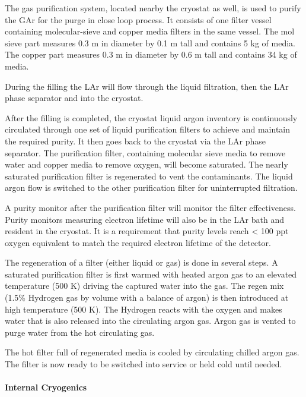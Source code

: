 The gas purification system, located nearby the cryostat as well, is used to purify the GAr for the purge in close loop process. It consists of one filter vessel containing molecular-sieve and copper media filters in the same vessel. The mol sieve part measures 0.3 m in diameter by 0.1 m tall and contains 5 kg of media. The copper part measures 0.3 m in diameter by 0.6 m tall and contains 34 kg of media.

During the filling the LAr will flow through the liquid filtration, then the LAr phase separator and into the cryostat.

After the filling is completed, the cryostat liquid argon inventory is continuously circulated through one set of liquid purification filters to achieve and maintain the required purity. It then goes back to the cryostat via the LAr phase separator. The purification filter, containing molecular sieve media to remove water and copper media to remove oxygen, will become saturated. The nearly saturated purification filter is regenerated to vent the contaminants. The liquid argon flow is switched to the other purification filter for uninterrupted filtration.

A purity monitor after the purification filter will monitor the filter effectiveness. Purity monitors measuring electron lifetime will also be in the LAr bath and resident in the cryostat. It is a requirement that purity levels reach < 100 ppt oxygen equivalent to match the required electron lifetime of the detector. 

The regeneration of a filter (either liquid or gas) is done in several steps. A saturated purification filter is first warmed with heated argon gas to an elevated temperature (500 K) driving the captured water into the gas. The regen mix (1.5\% Hydrogen gas by volume with a balance of argon) is then introduced at high temperature (500 K). The Hydrogen reacts with the oxygen and makes water that is also released into the circulating argon gas. Argon gas is vented to purge water from the hot circulating gas. 

The hot filter full of regenerated media is cooled by circulating chilled argon gas. The filter is now ready to be switched into service or held cold until needed. 

\paragraph{Internal Cryogenics}

